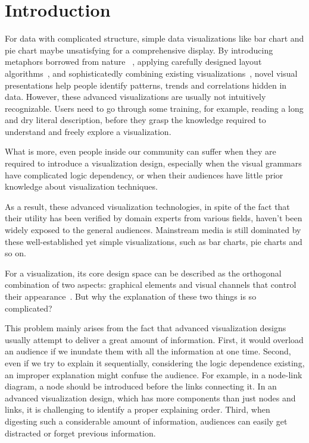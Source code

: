 
\section{Introduction} %
For data with complicated structure, simple data visualizations like bar chart and pie chart maybe unsatisfying for a comprehensive display. By introducing metaphors borrowed from nature ~\cite{cao_whisper:_2012,huron_visual_2013}, applying carefully designed layout algorithms~\cite{wu_opinionflow:_2014,chi_morphable_2015}, and sophisticatedly combining existing visualizations~\cite{zhao_x0023;fluxflow:_2014}, novel visual presentations help people identify patterns, trends and correlations hidden in data. However, these advanced visualizations are usually not intuitively recognizable. Users need to go through some training, for example, reading a long and dry literal description, before they grasp the knowledge required to understand and freely explore a visualization.\par
What is more, even people inside our community can suffer when they are required to introduce a visualization design, especially when the visual grammars have complicated logic dependency, or when their audiences have little prior knowledge about visualization techniques.\par
As a result, these advanced visualization technologies, in spite of
the fact that their utility has been verified by domain experts from various fields, haven't been widely exposed to the general audiences. Mainstream media is still dominated by these well-established yet simple visualizations, such as bar charts, pie charts and so on.

For a visualization, its core design space can be described as the orthogonal combination of two aspects: graphical elements and visual channels that control their appearance~\cite{munzner_visualization_2014}. But why the explanation of these two things is so complicated? 

This problem mainly arises from the fact that advanced visualization designs usually attempt to deliver a great amount of information. First, it would overload an audience if we inundate them with all the information at one time. Second, even if we try to explain it sequentially, considering the logic dependence existing, an improper explanation might confuse the audience. For example, in a node-link diagram, a node should be introduced before the links connecting it. In an advanced visualization design, which has more components than just nodes and links, it is challenging to identify a proper explaining order. Third, when digesting such a considerable amount of information, audiences can easily get distracted or forget previous information.   

